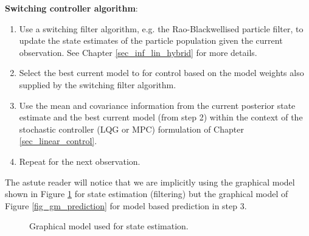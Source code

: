 \textbf{Switching controller algorithm}:
\begin{enumerate}
\item
Use a switching filter algorithm, e.g. the Rao-Blackwellised particle filter, to update the state estimates of the particle population given the current observation. See Chapter \ref{sec_inf_lin_hybrid} for more details.
\item
Select the best current model to for control based on the model weights also supplied by the switching filter algorithm.
\item
Use the mean and covariance information from the current posterior state estimate and the best current model (from step 2) within the context of the stochastic controller (LQG or MPC) formulation of Chapter \ref{sec_linear_control}.
\item
Repeat for the next observation. 
\end{enumerate} 
The astute reader will notice that we are implicitly using the graphical model shown in Figure \ref{fig_gm_filter} for state estimation (filtering) but the graphical model of Figure \ref{fig_gm_prediction} for model based prediction in step 3.
\begin{figure}[H] 
\centering
{}
\caption{Graphical model used for state estimation.}
\label{fig_gm_filter}
\end{figure}
